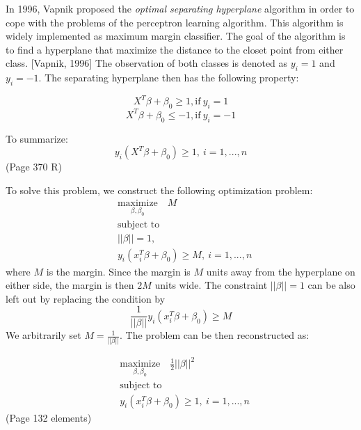 In 1996, Vapnik proposed the \emph{optimal separating hyperplane} algorithm in order to cope with the problems of the perceptron learning algorithm.
This algorithm is widely implemented as maximum margin classifier.
The goal of the algorithm is to find a hyperplane that maximize the distance to the closet point from either class. [Vapnik, 1996]
The observation of both classes is denoted as $y_i = 1$ and $y_i = -1$. The separating hyperplane then has the following property:

\begin{equation}
    X^T \beta + \beta_0 \geq 1, \text{if}\ y_i = 1
\end{equation}
\begin{equation}
    X^T \beta + \beta_0 \leq -1, \text{if}\ y_i = -1
\end{equation}

To summarize:
\begin{equation}
    y_i(X^T \beta + \beta_0) \geq 1,\ i = 1, ..., n
\end{equation}
(Page 370 R)

To solve this problem, we construct the following optimization problem:
\begin{equation}
    \begin{aligned}
      & \underset{\textstyle {\beta, \beta_0}}{\text{maximize}} \quad
        M \\
      & \text{subject to} \\
      & ||\beta|| = 1, \\
      & y_i(x_i^T \beta + \beta_0) \geq M,\ i = 1, ..., n
    \end{aligned}
\end{equation}
where $M$ is the margin. Since the margin is $M$ units away from the hyperplane on either side,
the margin is then $2M$ units wide. The constraint $||\beta|| = 1$ can be also left out by replacing
the condition by
\begin{equation}
    \frac{1}{||\beta||}y_i(x_i^T \beta + \beta_0) \geq M
\end{equation}
We arbitrarily set $M = \frac{1}{||\beta||}$. The problem can be then reconstructed as:

\begin{equation}
    \begin{aligned}
      & \underset{\textstyle {\beta, \beta_0}}{\text{maximize}} \quad
        \frac12 ||\beta||^2 \\
      & \text{subject to} \\
      & y_i(x_i^T \beta + \beta_0) \geq 1,\ i = 1, ..., n
    \end{aligned}
\end{equation}
(Page 132 elements)

